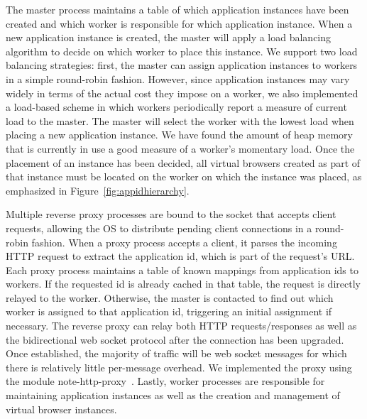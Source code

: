 The master process maintains a table of which application instances have been created and which
worker is responsible for which application instance.  When a new application instance is created,
the master will apply a load balancing algorithm to decide on which worker to place this instance.  
We support two load balancing strategies: first, the master can assign application instances
to workers in a simple round-robin fashion.  However, since application instances may vary
widely in terms of the actual cost they impose on a worker, we also implemented a load-based
scheme in which workers periodically report a measure of current load to the master.
The master will select the worker with the lowest load when placing a new application instance.
We have found the amount of heap memory that is currently in use a good measure of a worker's 
momentary load.  Once the placement of an instance has been decided, all
virtual browsers created as part of that instance must be located on the worker on which the instance
was placed, as emphasized in Figure~\ref{fig:appidhierarchy}.

Multiple reverse proxy processes are bound to the socket that accepts client requests, allowing
the OS to distribute pending client connections in a round-robin fashion.  
When a proxy process accepts a client, it parses the incoming HTTP request to extract the application
id, which is part of the request's URL.  Each proxy process maintains a table of known mappings from 
application ids to workers.  If the requested id is already cached in that table, the request is directly
relayed to the worker.  Otherwise, the master is contacted to find out which worker is assigned
to that application id, triggering an initial assignment if necessary.  The reverse proxy can 
relay both HTTP requests/responses as well as the bidirectional web socket protocol after the
connection has been upgraded.  Once established, the majority of traffic will be web socket
messages for which there is relatively little per-message overhead.  We implemented the proxy 
using the \nodejs{} module note-http-proxy~\cite{nodeproxy}.
Lastly, worker processes are responsible for maintaining application instances as well as the
creation and management of virtual browser instances.


